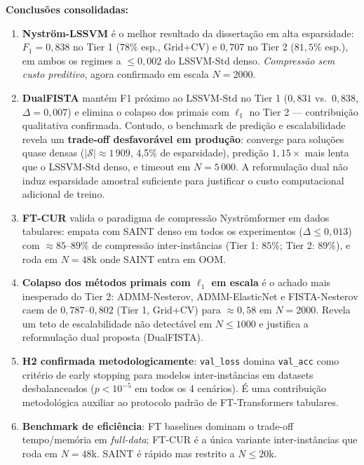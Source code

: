 \documentclass[12pt,a4paper]{article}
\begin{document}
\textbf{Conclusões consolidadas:}
\begin{enumerate}
  \item \textbf{Nyström-LSSVM} é o melhor resultado da dissertação em alta
        esparsidade: $F_1 = 0{,}838$ no Tier 1 (\(78\%\) esp., Grid+CV) e
        $0{,}707$ no Tier 2 (\(81{,}5\%\) esp.), em ambos os regimes a
        $\leq 0{,}002$ do LSSVM-Std denso. \emph{Compressão sem custo
        preditivo}, agora confirmado em escala $N=2000$.
  \item \textbf{DualFISTA} mantém F1 próximo ao LSSVM-Std no Tier 1
        ($0{,}831$ vs.\ $0{,}838$, $\Delta{=}0{,}007$) e elimina o colapso
        dos primais com $\ell_1$ no Tier 2 — contribuição qualitativa
        confirmada. Contudo, o benchmark de predição e escalabilidade revela
        um \textbf{trade-off desfavorável em produção}: converge para soluções
        quase densas ($|\mathcal{S}|{\approx}1\,909$, 4,5\% de esparsidade),
        predição $1{,}15{\times}$ mais lenta que o LSSVM-Std denso, e timeout
        em $N{=}5\,000$. A reformulação dual não induz esparsidade amostral
        suficiente para justificar o custo computacional adicional de treino.
  \item \textbf{FT-CUR} valida o paradigma de compressão Nyströmformer em
        dados tabulares: empata com SAINT denso em todos os experimentos
        ($\Delta \leq 0{,}013$) com \(\approx 85\text{--}89\%\) de compressão
        inter-instâncias (Tier 1: $85\%$; Tier 2: $89\%$), e roda em
        $N=48$k onde SAINT entra em OOM.
  \item \textbf{Colapso dos métodos primais com $\ell_1$ em escala} é o
        achado mais inesperado do Tier 2: ADMM-Nesterov, ADMM-ElasticNet e
        FISTA-Nesterov caem de $0{,}787$--$0{,}802$ (Tier 1, Grid+CV) para
        $\approx 0{,}58$ em $N=2000$. Revela um teto
        de escalabilidade não detectável em $N \leq 1000$ e justifica a
        reformulação dual proposta (DualFISTA).
  \item \textbf{H2 confirmada metodologicamente}: \texttt{val\_loss}
        domina \texttt{val\_acc} como critério de early stopping para
        modelos inter-instâncias em datasets desbalanceados
        ($p < 10^{-5}$ em todos os 4 cenários). É uma contribuição
        metodológica auxiliar ao protocolo padrão de FT-Transformers
        tabulares.
  \item \textbf{Benchmark de eficiência}: FT baselines dominam o
        trade-off tempo/memória em \emph{full-data}; FT-CUR é a única
        variante inter-instâncias que roda em $N=48$k. SAINT é rápido
        mas restrito a $N \leq 20$k.
\end{enumerate}
\end{document}
